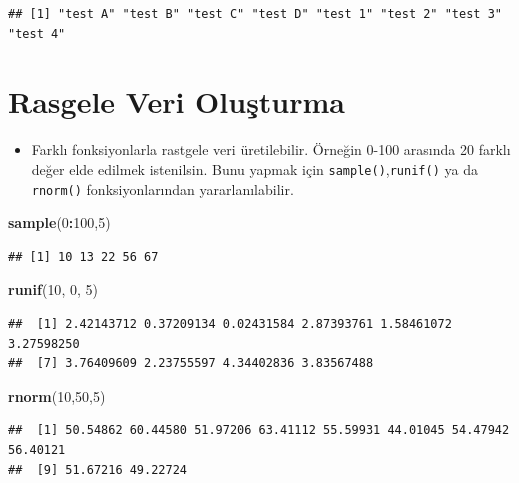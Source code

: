 \documentclass[
  oneside]{book}
\newenvironment{Shaded}{\begin{snugshade}}{\end{snugshade}}
\newcommand{\DecValTok}[1]{\textcolor[rgb]{0.00,0.00,0.81}{#1}}
\newcommand{\FunctionTok}[1]{\textcolor[rgb]{0.13,0.29,0.53}{\textbf{#1}}}
\newcommand{\NormalTok}[1]{#1}
\newcommand{\SpecialCharTok}[1]{\textcolor[rgb]{0.81,0.36,0.00}{\textbf{#1}}}
\providecommand{\tightlist}{%
  \setlength{\itemsep}{0pt}\setlength{\parskip}{0pt}}
\begin{document}
\begin{verbatim}
## [1] "test A" "test B" "test C" "test D" "test 1" "test 2" "test 3" "test 4"
\end{verbatim}

\hypertarget{rasgele-veri-oluux15fturma}{%
\section{Rasgele Veri Oluşturma}\label{rasgele-veri-oluux15fturma}}

\begin{itemize}
\tightlist
\item
  Farklı fonksiyonlarla rastgele veri üretilebilir. Örneğin 0-100 arasında 20 farklı değer elde edilmek istenilsin. Bunu yapmak için \texttt{sample()},\texttt{runif()} ya da \texttt{rnorm()} fonksiyonlarından yararlanılabilir.
\end{itemize}

\begin{Shaded}
\begin{Highlighting}[]
\FunctionTok{sample}\NormalTok{(}\DecValTok{0}\SpecialCharTok{:}\DecValTok{100}\NormalTok{,}\DecValTok{5}\NormalTok{)}
\end{Highlighting}
\end{Shaded}

\begin{verbatim}
## [1] 10 13 22 56 67
\end{verbatim}

\begin{Shaded}
\begin{Highlighting}[]
\FunctionTok{runif}\NormalTok{(}\DecValTok{10}\NormalTok{,  }\DecValTok{0}\NormalTok{, }\DecValTok{5}\NormalTok{)}
\end{Highlighting}
\end{Shaded}

\begin{verbatim}
##  [1] 2.42143712 0.37209134 0.02431584 2.87393761 1.58461072 3.27598250
##  [7] 3.76409609 2.23755597 4.34402836 3.83567488
\end{verbatim}

\begin{Shaded}
\begin{Highlighting}[]
\FunctionTok{rnorm}\NormalTok{(}\DecValTok{10}\NormalTok{,}\DecValTok{50}\NormalTok{,}\DecValTok{5}\NormalTok{)}
\end{Highlighting}
\end{Shaded}

\begin{verbatim}
##  [1] 50.54862 60.44580 51.97206 63.41112 55.59931 44.01045 54.47942 56.40121
##  [9] 51.67216 49.22724
\end{verbatim}
\end{document}
